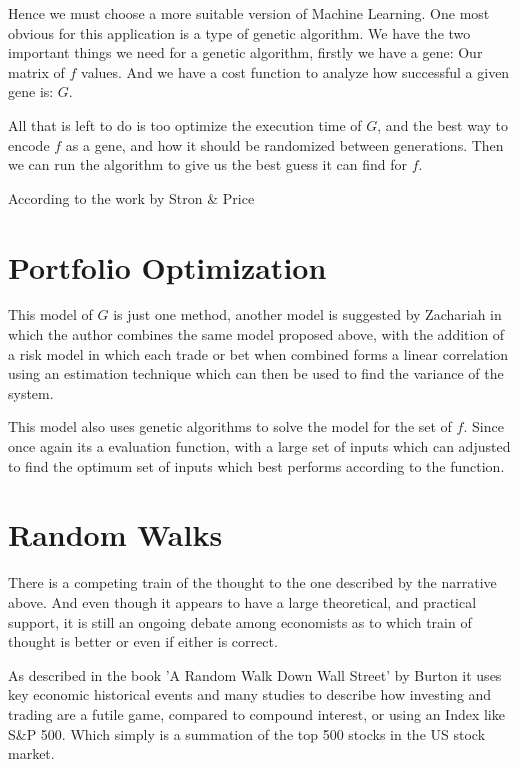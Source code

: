 \documentclass[12pt]{article}
\begin{document}
    Hence we must choose a more suitable version of Machine Learning. One most obvious 
    for this application is a type of genetic algorithm. We have the two important things
    we need for a genetic algorithm, firstly we have a gene: Our matrix of \(f\) values.
    And we have a cost function to analyze how successful a given gene is: \(G\).

    All that is left to do is too optimize the execution time of \(G\), and the best way to
    encode \(f\) as a gene, and how it should be randomized between generations.
    Then we can run the algorithm to give us the best guess it can find for \(f\).

    According to the work by Stron \& Price \cite{Storn-Price}

\section{Portfolio Optimization}

    This model of \(G\) is just one method, another model is suggested by Zachariah
    \cite{Zachariah} in which the author combines the same model proposed above, with the 
    addition of a risk model in which each trade or bet when combined forms a linear correlation
    using an estimation technique which can then be used to find the variance of the system.

    This model also uses genetic algorithms to solve the model for the set of \(f\). 
    Since once again its a evaluation function, 
    with a large set of inputs which can adjusted to find the optimum set of inputs which best 
    performs according to the function.

\section{Random Walks}

    There is a competing train of the thought to the one described by the narrative above. And 
    even though it appears to have a large theoretical, and practical support, it is still an 
    ongoing debate among economists as to which train of thought is better or even if either is 
    correct.

    As described in the book 'A Random Walk Down Wall Street' by Burton \cite{Burton} it uses
    key economic historical events and many studies to describe how investing and trading are
    a futile game, compared to compound interest, or using an Index like S\&P 500. Which
    simply is a summation of the top 500 stocks in the US stock market.
\end{document}
